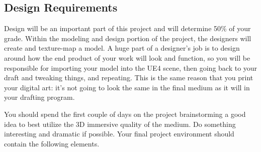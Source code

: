 \documentclass[12pt]{article}
\begin{document}
\subsection{Design Requirements}

Design will be an important part of this project and will determine 50\% of your grade.  Within the modeling and design portion of the project, the designers will create and texture-map a model.  A huge part of a designer’s job is to design around how the end product of your work will look and function, so you will be responsible for importing your model into the UE4 scene, then going back to your draft and tweaking things, and repeating.  This is the same reason that you print your digital art: it’s not going to look the same in the final medium as it will in your drafting program. 

You should spend the first couple of days on the project brainstorming a good idea to best utilize the 3D immersive quality of the medium. Do something interesting and dramatic if possible. Your final project environment should contain the following elements.
\end{document}
